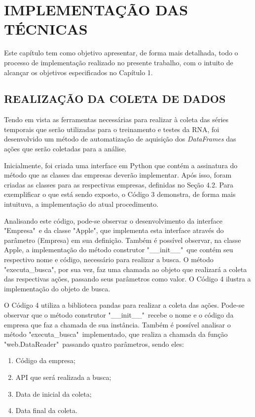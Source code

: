 
\chapter{IMPLEMENTAÇÃO DAS TÉCNICAS}\label{ch:implementacao}
Este capítulo tem como objetivo apresentar, de forma mais detalhada, todo o processo de implementação realizado no presente trabalho, com o intuito de alcançar os objetivos especificados no Capítulo 1.

\section{REALIZAÇÃO DA COLETA DE DADOS}
Tendo em vista as ferramentas necessárias para realizar à coleta das séries temporais que serão utilizadas para o treinamento e testes da RNA, foi desenvolvido um método de automatização de aquisição dos \textit{DataFrames} das ações que serão coletadas para a análise.

Inicialmente, foi criada uma interface em Python que contém a assinatura do método que as classes das empresas deverão implementar. Após isso, foram criadas as classes para as respectivas empresas, definidas no Seção 4.2. Para exemplificar o que está sendo exposto, o Código 3 demonstra, de forma mais intuituva, a implementação do atual procedimento.
\codigoPython\


Analisando este código, pode-se observar o desenvolvimento da interface "Empresa"\, e da classe "Apple", que implementa esta interface através do parâmetro (Empresa) em sua definição. Também é possível observar, na classe Apple, a implementação do método construtor "\_\_init\_\_"\, que contém seu respectivo nome e código, necessário para realizar a busca. O método "executa\_busca", por sua vez, faz uma chamada ao objeto que realizará a coleta das respectivas ações, passando seus parâmetros como valor. O Código 4 ilustra a implementação do objeto de busca.



O Código 4 utiliza a biblioteca pandas para realizar a coleta das ações. Pode-se observar que o método construtor "\_\_init\_\_"\, recebe o nome e o código da empresa que faz a chamada de sua instância. Também é possível analisar o método "executa\_busca"\, implementado, que realiza a chamada da função "web.DataReader"\,
passando quatro parâmetros, sendo eles:
\begin{enumerate}
\item Código da empresa;
\item API que será realizada a busca;
\item Data de inicial da coleta;
\item Data final da coleta.
\end{enumerate}

